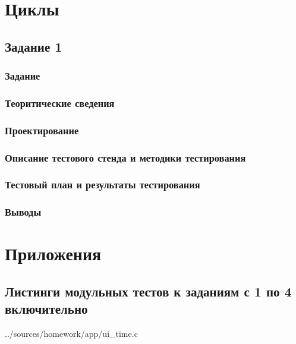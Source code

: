 \documentclass[12pt,a4paper]{report}
\begin{document}
\chapter{Циклы}
\section{Задание 1}
\subsection{Задание}
\subsection{Теоритические сведения}
\subsection{Проектирование}
\subsection{Описание тестового стенда и методики тестирования}
\subsection{Тестовый план и результаты тестирования}
\subsection{Выводы}

\chapter*{Приложения}
\section{Листинги модульных тестов к заданиям с 1 по 4 включительно}

{../sources/homework/app/ui_time.c}
\end{document}
